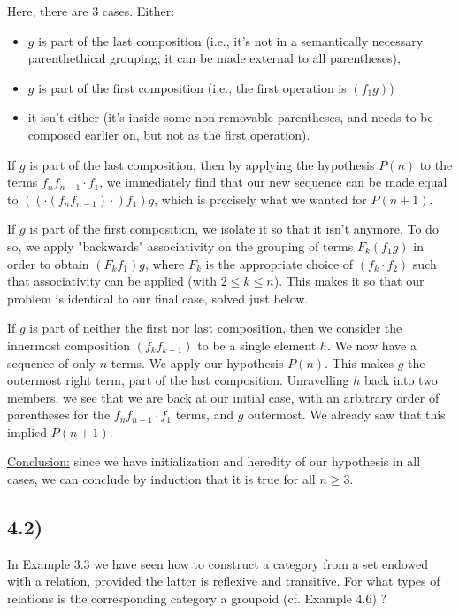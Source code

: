 \documentclass[12pt, letterpaper, twoside]{report}
\begin{document}
Here, there are 3 cases. Either:
\begin{itemize}
	\item $g$ is part of the last composition (i.e., it's not in a semantically necessary parenthethical grouping; it can be made external to all parentheses),
	\item $g$ is part of the first composition (i.e., the first operation is $(f_1 g)$)
	\item it isn't either (it's inside some non-removable parentheses, and needs to be composed earlier on, but not as the first operation).
\end{itemize}

If $g$ is part of the last composition, then by applying the hypothesis $P(n)$ to the terms $f_n f_{n-1} \cdot f_1$, we immediately find that our new sequence can be made equal to $((\cdot(f_n f_{n-1}) \cdot) f_1) g$, which is precisely what we wanted for $P(n+1)$.

If $g$ is part of the first composition, we isolate it so that it isn't anymore. To do so, we apply "backwards" associativity on the grouping of terms $F_k (f_1 g)$ in order to obtain $(F_k f_1) g$, where $F_k$ is the appropriate choice of $(f_k \cdot f_2)$ such that associativity can be applied (with $2 \leq k \leq n$). This makes it so that our problem is identical to our final case, solved just below.

If $g$ is part of neither the first nor last composition, then we consider the innermost composition $(f_k f_{k-1})$ to be a single element $h$. We now have a sequence of only $n$ terms. We apply our hypothesis $P(n)$. This makes $g$ the outermost right term, part of the last composition. Unravelling $h$ back into two members, we see that we are back at our initial case, with an arbitrary order of parentheses for the $f_n f_{n-1} \cdot f_1$ terms, and $g$ outermost. We already saw that this implied $P(n+1)$.

\underline{Conclusion:} since we have initialization and heredity of our hypothesis in all cases, we can conclude by induction that it is true for all $n \geq 3$.



\subsection*{4.2)}

In Example 3.3 we have seen how to construct a category from a set endowed with a relation, provided the latter is reflexive and transitive. For what types of relations is the corresponding category a groupoid (cf. Example 4.6) ?
\end{document}
